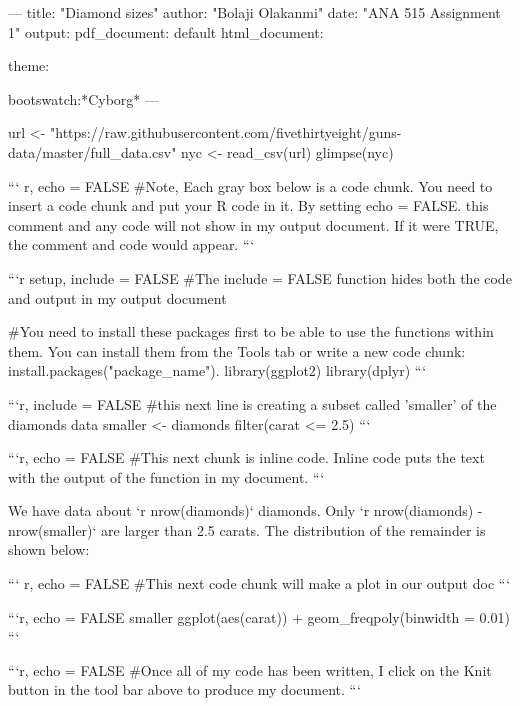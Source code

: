 ---
title: "Diamond sizes"
author: "Bolaji Olakanmi"
date: "ANA 515 Assignment 1"
output:
  pdf_document: default
  html_document:
  
    theme:
      
      bootswatch:*Cyborg*
---


url <- "https://raw.githubusercontent.com/fivethirtyeight/guns-data/master/full_data.csv"
nyc <- read_csv(url)
glimpse(nyc)


``` {r, echo = FALSE}
#Note, Each gray box below is a code chunk. You need to insert a code chunk and put your R code in it. By setting echo = FALSE. this comment and any code will not show in my output document. If it were TRUE, the comment and code would appear. 
```

```{r setup, include = FALSE}
#The include = FALSE function hides both the code and output in my output document

#You need to install these packages first to be able to use the functions within them. You can install them from the Tools tab or write a new code chunk: install.packages("package_name"). 
library(ggplot2)
library(dplyr)
```

```{r, include = FALSE}
#this next line is creating a subset called 'smaller' of the diamonds data
smaller <- diamonds %
  filter(carat <= 2.5)
```

```{r, echo = FALSE}
#This next chunk is inline code. Inline code puts the text with the output of the function in my document.
```

We have data about `r nrow(diamonds)` diamonds. Only 
`r nrow(diamonds) - nrow(smaller)` are larger than
2.5 carats. The distribution of the remainder is shown
below:

``` {r, echo = FALSE}
#This next code chunk will make a plot in our output doc
```

```{r, echo = FALSE}
smaller %
  ggplot(aes(carat)) + 
  geom_freqpoly(binwidth = 0.01)
```

```{r, echo = FALSE}
#Once all of my code has been written, I click on the Knit button in the tool bar above to produce my document.
```
